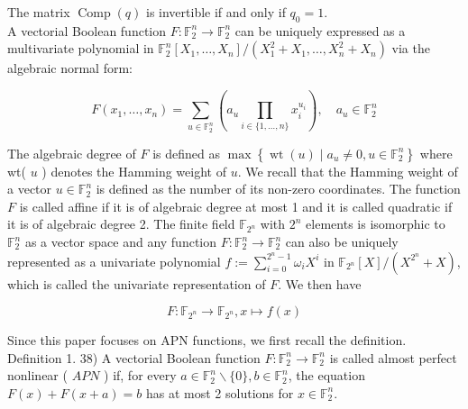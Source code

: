 \documentclass[10pt]{article}
\begin{document}
The matrix $\operatorname{Comp}(q)$ is invertible if and only if $q_{0}=1$.\\
A vectorial Boolean function $F: \mathbb{F}_{2}^{n} \rightarrow \mathbb{F}_{2}^{n}$ can be uniquely expressed as a multivariate polynomial in $\mathbb{F}_{2}^{n}\left[X_{1}, \ldots, X_{n}\right] /\left(X_{1}^{2}+X_{1}, \ldots, X_{n}^{2}+X_{n}\right)$ via the algebraic normal form:

$$
F\left(x_{1}, \ldots, x_{n}\right)=\sum_{u \in \mathbb{F}_{2}^{n}}\left(a_{u} \prod_{i \in\{1, \ldots, n\}} x_{i}^{u_{i}}\right), \quad a_{u} \in \mathbb{F}_{2}^{n}
$$

The algebraic degree of $F$ is defined as $\max \left\{\operatorname{wt}(u) \mid a_{u} \neq 0, u \in \mathbb{F}_{2}^{n}\right\}$ where wt( $u$ ) denotes the Hamming weight of $u$. We recall that the Hamming weight of a vector $u \in \mathbb{F}_{2}^{n}$ is defined as the number of its non-zero coordinates. The function $F$ is called affine if it is of algebraic degree at most 1 and it is called quadratic if it is of algebraic degree 2. The finite field $\mathbb{F}_{2^{n}}$ with $2^{n}$ elements is isomorphic to $\mathbb{F}_{2}^{n}$ as a vector space and any function $F: \mathbb{F}_{2}^{n} \rightarrow \mathbb{F}_{2}^{n}$ can also be uniquely represented as a univariate polynomial $f:=\sum_{i=0}^{2^{n}-1} \omega_{i} X^{i}$ in $\mathbb{F}_{2^{n}}[X] /\left(X^{2^{n}}+X\right)$, which is called the univariate representation of $F$. We then have

$$
F: \mathbb{F}_{2^{n}} \rightarrow \mathbb{F}_{2^{n}}, x \mapsto f(x)
$$

Since this paper focuses on APN functions, we first recall the definition.\\
Definition 1. 38) A vectorial Boolean function $F: \mathbb{F}_{2}^{n} \rightarrow \mathbb{F}_{2}^{n}$ is called almost perfect nonlinear ( $A P N$ ) if, for every $a \in \mathbb{F}_{2}^{n} \backslash\{0\}, b \in \mathbb{F}_{2}^{n}$, the equation $F(x)+F(x+a)=b$ has at most 2 solutions for $x \in \mathbb{F}_{2}^{n}$.
\end{document}
